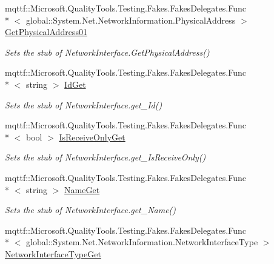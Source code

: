 \begin{DoxyCompactItemize}
mqttf\-::\-Microsoft.\-Quality\-Tools.\-Testing.\-Fakes.\-Fakes\-Delegates.\-Func\\*
$<$ global\-::\-System.\-Net.\-Network\-Information.\-Physical\-Address $>$ \hyperlink{class_system_1_1_net_1_1_network_information_1_1_fakes_1_1_stub_network_interface_aef92183142d34822466f871e4b87c0fa}{Get\-Physical\-Address01}
\begin{DoxyCompactList}\small\item\em Sets the stub of Network\-Interface.\-Get\-Physical\-Address()\end{DoxyCompactList}\item 
mqttf\-::\-Microsoft.\-Quality\-Tools.\-Testing.\-Fakes.\-Fakes\-Delegates.\-Func\\*
$<$ string $>$ \hyperlink{class_system_1_1_net_1_1_network_information_1_1_fakes_1_1_stub_network_interface_a1deac7c9af95c06b677cb0cdcbc3506c}{Id\-Get}
\begin{DoxyCompactList}\small\item\em Sets the stub of Network\-Interface.\-get\-\_\-\-Id()\end{DoxyCompactList}\item 
mqttf\-::\-Microsoft.\-Quality\-Tools.\-Testing.\-Fakes.\-Fakes\-Delegates.\-Func\\*
$<$ bool $>$ \hyperlink{class_system_1_1_net_1_1_network_information_1_1_fakes_1_1_stub_network_interface_a7d20ee6914e892a56bf1f3bbf1751efc}{Is\-Receive\-Only\-Get}
\begin{DoxyCompactList}\small\item\em Sets the stub of Network\-Interface.\-get\-\_\-\-Is\-Receive\-Only()\end{DoxyCompactList}\item 
mqttf\-::\-Microsoft.\-Quality\-Tools.\-Testing.\-Fakes.\-Fakes\-Delegates.\-Func\\*
$<$ string $>$ \hyperlink{class_system_1_1_net_1_1_network_information_1_1_fakes_1_1_stub_network_interface_a069ea01bb45097ef2a5444fc0a6072d2}{Name\-Get}
\begin{DoxyCompactList}\small\item\em Sets the stub of Network\-Interface.\-get\-\_\-\-Name()\end{DoxyCompactList}\item 
mqttf\-::\-Microsoft.\-Quality\-Tools.\-Testing.\-Fakes.\-Fakes\-Delegates.\-Func\\*
$<$ global\-::\-System.\-Net.\-Network\-Information.\-Network\-Interface\-Type $>$ \hyperlink{class_system_1_1_net_1_1_network_information_1_1_fakes_1_1_stub_network_interface_a50b63807b4bd3c782b7a11adbca78b89}{Network\-Interface\-Type\-Get}

\end{DoxyCompactItemize}
